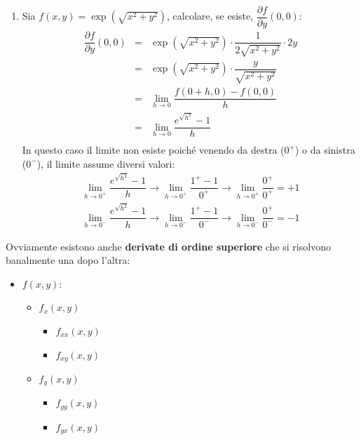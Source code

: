 \documentclass[a4paper]{article}
\newcommand{\definition}[1]{\textcolor{Red3}{\textbf{#1}}}
\begin{document}
\begin{enumerate}[label=\alph*)]
		\item Sia $f\left(x,y\right) = \exp\left(\sqrt{x^{2}+y^{2}}\right)$, calcolare, se esiste, $\dfrac{\partial f}{\partial y}\left(0,0\right)$:
		\begin{equation*}
			\begin{array}{rcl}
				\dfrac{\partial f}{\partial y}\left(0,0\right) &=& \exp\left(\sqrt{x^{2}+y^{2}}\right) \cdot \dfrac{1}{2\sqrt{x^{2}+y^{2}}} \cdot 2y \\ [2em]
				&=& \exp\left(\sqrt{x^{2}+y^{2}}\right) \cdot \dfrac{y}{\sqrt{x^{2}+y^{2}}} \\ [2em]
				&=& \displaystyle\lim_{h\rightarrow 0} \dfrac{f\left(0+h,0\right)-f\left(0,0\right)}{h} \\ [1.5em]
				&=& \displaystyle\lim_{h\rightarrow 0} \dfrac{e^{\sqrt{h^{2}}}-1}{h} \\ [2em]
			\end{array}
		\end{equation*}
		In questo caso il limite non esiste poiché venendo da destra ($0^{+}$) o da sinistra ($0^{-}$), il limite assume diversi valori:
		\begin{equation*}
			\begin{array}{rcl}
				\displaystyle\lim_{h\rightarrow 0^{+}} \dfrac{e^{\sqrt{h^{2}}}-1}{h} 
				\longrightarrow
				\displaystyle\lim_{h\rightarrow 0^{+}} \dfrac{1^{+}-1}{0^{+}}
				\longrightarrow
				\displaystyle\lim_{h\rightarrow 0^{+}} \dfrac{0^{+}}{0^{+}} = +1 
				\\ [2em]
				\displaystyle\lim_{h\rightarrow 0^{-}} \dfrac{e^{\sqrt{h^{2}}}-1}{h} 
				\longrightarrow
				\displaystyle\lim_{h\rightarrow 0^{-}} \dfrac{1^{+}-1}{0^{-}}
				\longrightarrow
				\displaystyle\lim_{h\rightarrow 0^{-}} \dfrac{0^{+}}{0^{-}} = -1
			\end{array}
		\end{equation*}
	\end{enumerate}
	Ovviamente esistono anche \definition{derivate di ordine superiore} che si risolvono banalmente una dopo l'altra:
	\begin{itemize}
		\item $f\left(x,y\right)$:
		\begin{itemize}
			\item $f_{x}\left(x,y\right)$
			\begin{itemize}
				\item $f_{xx}\left(x,y\right)$
				\item $f_{xy}\left(x,y\right)$
			\end{itemize}
			\item $f_{y}\left(x,y\right)$
			\begin{itemize}
				\item $f_{yy}\left(x,y\right)$
				\item $f_{yx}\left(x,y\right)$
			\end{itemize}
		\end{itemize}
	\end{itemize}
\end{document}
